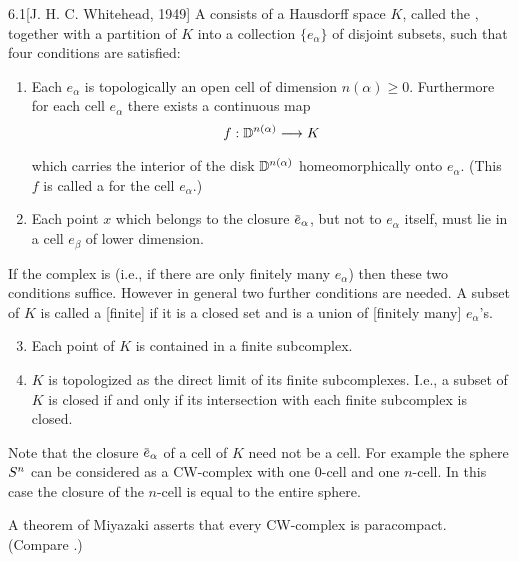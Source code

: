 \documentclass[../main]{subfiles}
\begin{document}
\begin{customdef}{6.1}[J. H. C. Whitehead, 1949]
\label{def:06.01}
A  consists of a Hausdorff space $K$, called the , together with a partition of $K$ into a collection $\{e_{\alpha}\}$ of disjoint subsets, such that four conditions are satisfied:
\begin{enumerate}[label=\arabic*)]
	\item Each $e_{\alpha}$ is topologically an open cell of dimension $n(\alpha) \geq 0$. Furthermore for each cell $e_{\alpha}$ there exists a continuous map
    \[
    f:{\disk^{n(\alpha)}}\varrightarrow{} K
    \]
    which carries the interior of the disk $\mathbb{D}^{n(\alpha)}$ homeomorphically onto $e_{\alpha}$. (This $f$ is called a  for the cell $e_{\alpha}$.)
    \item Each point $x$ which belongs to the closure $\xoverline{e}_{\alpha}$, but not to $e_{\alpha}$ itself, must lie in a cell $e_\beta$ of lower dimension.
\end{enumerate}
If the complex is  (i.e., if there are only finitely many $e_{\alpha}$) then these two conditions suffice. However in general two further conditions are needed. A subset of $K$ is called a [finite]  if it is a closed set and is a union of [finitely many] $e_{\alpha}$'s.
\begin{enumerate}[label=\arabic*)]
	\setcounter{enumi}{2}
	\item {} Each point of $K$ is contained in a finite subcomplex.
	\item {} $K$ is topologized as the direct limit of its finite subcomplexes. I.e., a subset of $K$ is closed if and only if its intersection with each finite subcomplex is closed.
\end{enumerate}
\end{customdef}
Note that the closure $\xoverline{e}_{\alpha}$ of a cell of $K$ need not be a cell. For example the sphere $S^{n}$ can be considered as a CW-complex with one $0$-cell and one $n$-cell. In this case the closure of the $n$-cell is equal to the entire sphere.

A theorem of Miyazaki \cite{miyazaki1952} asserts that every CW-complex is paracompact. (Compare \cite[p.~419]{dugundji1966}.)
\end{document}
